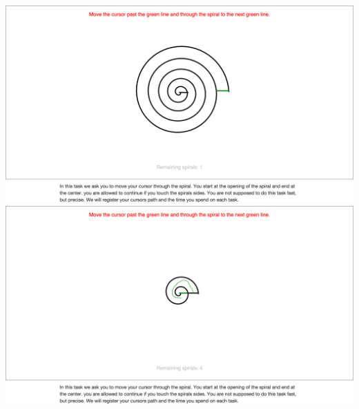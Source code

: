 \begin{appendices}
\begin{minipage}{\textwidth}
\centering
\includegraphics[width=\textwidth]{images/screenshots/ex_step_5_spiral_4}
\label{fig:ex_step_5_spiral_4}
\includegraphics[width=\textwidth]{images/screenshots/ex_step_5_spiral_path}
\label{fig:ex_step_5_spiral_path}
\end{minipage}


\end{appendices}
